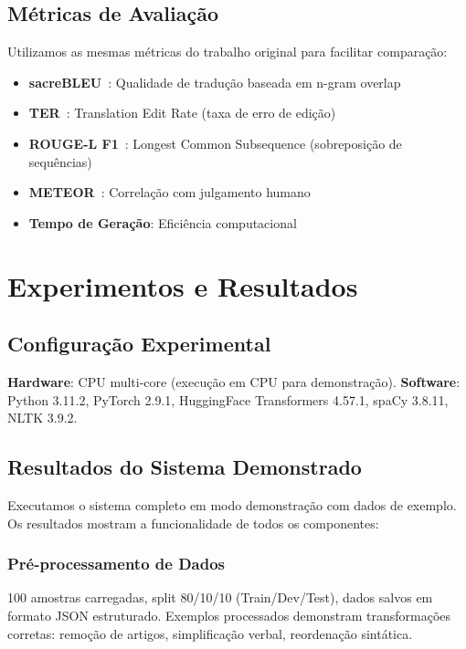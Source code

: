 \documentclass[12pt]{article}
\begin{document}
\subsection{Métricas de Avaliação}

Utilizamos as mesmas métricas do trabalho original para facilitar comparação:
\begin{itemize}
\item \textbf{sacreBLEU}~\cite{post2018}: Qualidade de tradução baseada em n-gram overlap
\item \textbf{TER}~\cite{snover2006}: Translation Edit Rate (taxa de erro de edição)
\item \textbf{ROUGE-L F1}~\cite{lin2004}: Longest Common Subsequence (sobreposição de sequências)
\item \textbf{METEOR}~\cite{banerjee2005}: Correlação com julgamento humano
\item \textbf{Tempo de Geração}: Eficiência computacional
\end{itemize}

\section{Experimentos e Resultados}

\subsection{Configuração Experimental}

\textbf{Hardware}: CPU multi-core (execução em CPU para demonstração). \textbf{Software}: Python 3.11.2, PyTorch 2.9.1, HuggingFace Transformers 4.57.1, spaCy 3.8.11, NLTK 3.9.2.

\subsection{Resultados do Sistema Demonstrado}

Executamos o sistema completo em modo demonstração com dados de exemplo. Os resultados mostram a funcionalidade de todos os componentes:

\subsubsection{Pré-processamento de Dados}

100 amostras carregadas, split 80/10/10 (Train/Dev/Test), dados salvos em formato JSON estruturado. Exemplos processados demonstram transformações corretas: remoção de artigos, simplificação verbal, reordenação sintática.
\end{document}
